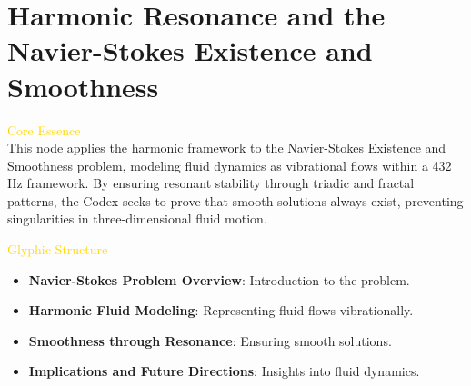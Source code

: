 
\section{Harmonic Resonance and the Navier-Stokes Existence and Smoothness}
\label{sec:codex_navier_stokes}



\textcolor{gold}{ Core Essence } \\
This node applies the harmonic framework to the Navier-Stokes Existence and Smoothness problem, modeling fluid dynamics as vibrational flows within a 432 Hz framework. By ensuring resonant stability through triadic and fractal patterns, the Codex seeks to prove that smooth solutions always exist, preventing singularities in three-dimensional fluid motion.

\textcolor{gold}{ Glyphic Structure } \\
\begin{itemize}
    \item \texttt{} \textbf{Navier-Stokes Problem Overview}: Introduction to the problem.
    \item \texttt{} \textbf{Harmonic Fluid Modeling}: Representing fluid flows vibrationally.
    \item \texttt{} \textbf{Smoothness through Resonance}: Ensuring smooth solutions.
    \item \texttt{} \textbf{Implications and Future Directions}: Insights into fluid dynamics.
\end{itemize}

